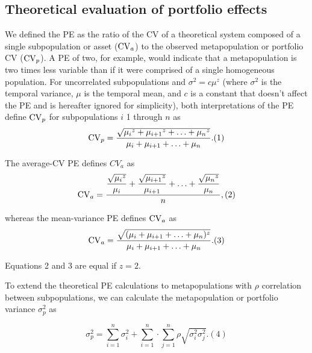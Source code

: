 \subsection{Theoretical evaluation of portfolio effects}

We defined the PE as the ratio of the CV of a theoretical system composed of a
single subpopulation or asset ($\mathrm{CV}_a$) to the observed metapopulation or
portfolio CV ($\mathrm{CV}_p$). A PE of two, for example, would indicate that a
metapopulation is two times less variable than if it were comprised of a single
homogeneous population. For uncorrelated subpopulations and $\sigma^2 = c
\mu^z$ (where $\sigma^2$ is the temporal variance, $\mu$ is the temporal mean,
and $c$ is a constant that doesn't affect the PE and is hereafter ignored for
simplicity), both interpretations of the PE define $\mathrm{CV}_p$ for subpopulations
$i$ 1 through $n$ as
\begin{equation}
\mathrm{CV}_p = \dfrac{\sqrt{{\mu_i}^z + {\mu_{i+1}}^z + \ldots + {\mu_n}^z}}{\mu_i +
\mu_{i+1} + \ldots + \mu_n}. (1)
\end{equation}

\noindent The average-CV PE defines $CV_a$ as
\begin{equation}
\mathrm{CV}_a = \dfrac{\dfrac{\sqrt{{\mu_i}^z}}{\mu_i} +
\dfrac{\sqrt{{\mu_{i+1}}^z}}{\mu_{i+1}} + \ldots +
\dfrac{\sqrt{{\mu_n}^z}}{\mu_n}}{n}, (2)
\end{equation}

\noindent whereas the mean-variance PE defines $\mathrm{CV}_a$ as
\begin{equation}
\mathrm{CV}_a = \dfrac{\sqrt{(\mu_i + \mu_{i+1} + \ldots + \mu_n)^z}}{\mu_i +
\mu_{i+1} + \ldots + \mu_n}. (3)
\end{equation}

\noindent Equations 2 and 3 are equal if $z = 2$.

To extend the theoretical PE calculations to metapopulations with $\rho$
correlation between subpopulations, we can calculate the metapopulation or
portfolio variance $\sigma^2_p$ as

\begin{equation}
 \sigma^2_p = \sum_{i =1}^n \sigma^2_i + \sum_{i =1}^n \cdot \sum_{j =1}^n \rho \sqrt{\sigma^2_i \sigma^2_j}. (4)
\end{equation}

